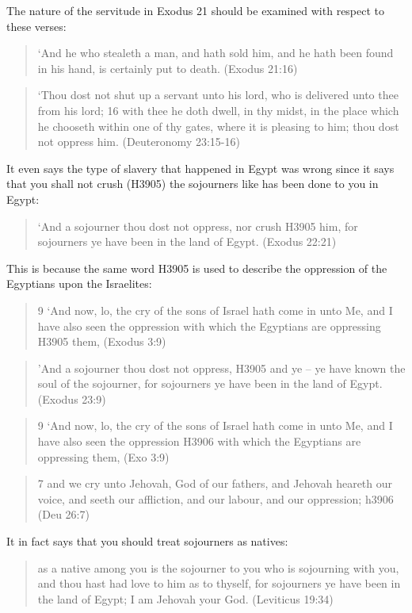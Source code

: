 \documentclass[11pt]{article}
\begin{document}
The nature of the servitude in Exodus 21 should be examined with respect to these verses:
\begin{quote}
`And he who stealeth a man, and hath sold him, and he hath been found in his hand, is certainly put to death. (Exodus 21:16)
\end{quote} 
 
\begin{quote}
`Thou dost not shut up a servant unto his lord, who is delivered unto thee from his lord;
16 with thee he doth dwell, in thy midst, in the place which he chooseth within one of thy gates, where it is pleasing to him; thou dost not oppress him. (Deuteronomy 23:15-16)
\end{quote} 

It even says the type of slavery that happened in Egypt was wrong since it says that you shall not crush (H3905) the sojourners like has been done to you in Egypt:
\begin{quote}
`And a sojourner thou dost not oppress, nor crush H3905 him, for sojourners ye have been in the land of Egypt. (Exodus 22:21)
\end{quote}

This is because the same word H3905 is used to describe the oppression of the Egyptians upon the Israelites:
\begin{quote}
9 `And now, lo, the cry of the sons of Israel hath come in unto Me, and I have also seen the oppression with which the Egyptians are oppressing H3905 them, (Exodus 3:9)
\end{quote}

\begin{quote}
'And a sojourner thou dost not oppress, H3905 and ye -- ye have known the soul of the sojourner, for sojourners ye have been in the land of Egypt. (Exodus 23:9)
\end{quote}

\begin{quote}
9 `And now, lo, the cry of the sons of Israel hath come in unto Me, and I have also seen the oppression H3906 with which the Egyptians are oppressing them, (Exo 3:9)
\end{quote}
\begin{quote}
7 and we cry unto Jehovah, God of our fathers, and Jehovah heareth our voice, and seeth our affliction, and our labour, and our oppression; h3906 (Deu 26:7)
\end{quote}


It in fact says that you should treat sojourners as natives:
\begin{quote}
as a native among you is the sojourner to you who is sojourning with you, and thou hast had love to him as to thyself, for sojourners ye have been in the land of Egypt; I am Jehovah your God. (Leviticus 19:34)
\end{quote}
\end{document}
